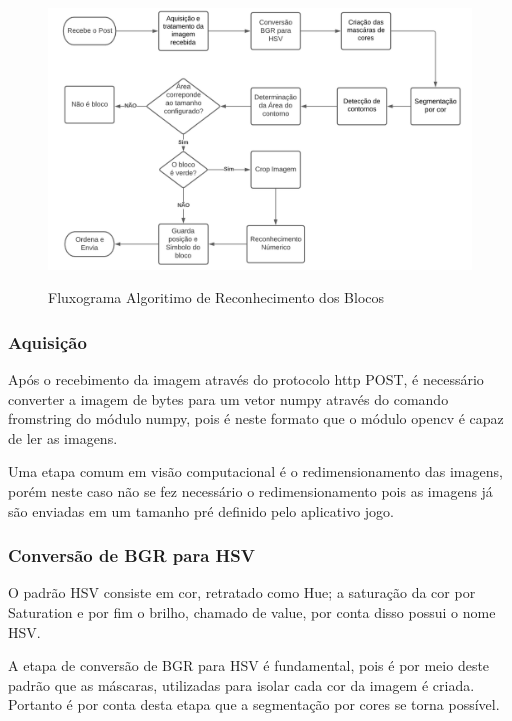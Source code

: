     \begin{figure}[H]
        \caption{Fluxograma Algoritimo de Reconhecimento dos Blocos}
        \centering
        \includegraphics[width=\linewidth]{Imagens/Cap4/fluxo.PNG}
        \label{figura:fluxo}
    \end{figure}


    \subsubsection{Aquisição}
    
    Após o recebimento da imagem através do protocolo http POST, é necessário converter a imagem de bytes para um vetor numpy através do comando fromstring do módulo numpy, pois é neste formato que o módulo opencv é capaz de ler as imagens. 
    
    Uma etapa comum em visão computacional é o redimensionamento  das imagens, porém neste caso não se fez necessário o redimensionamento pois as imagens já são enviadas em um tamanho pré definido pelo aplicativo jogo.

    \subsubsection{Conversão de BGR para HSV}
    O padrão HSV consiste em cor, retratado como Hue; a saturação da cor por Saturation e por fim o brilho, chamado de value, por conta disso possui o nome HSV.
    
    A etapa de conversão de BGR para HSV é fundamental, pois é por meio deste padrão que as máscaras, utilizadas para isolar cada cor da imagem é criada. Portanto é por conta desta etapa que a segmentação por cores se torna possível.

